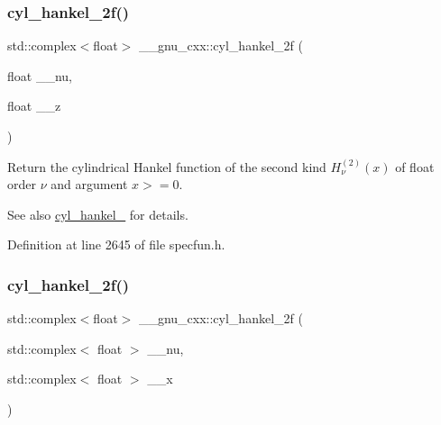 \subsubsection{\texorpdfstring{cyl\+\_\+hankel\+\_\+2f()}{cyl\_hankel\_2f()}\hspace{0.1cm}{\footnotesize\ttfamily [1/2]}}
{\footnotesize\ttfamily std\+::complex$<$float$>$ \+\_\+\+\_\+gnu\+\_\+cxx\+::cyl\+\_\+hankel\+\_\+2f (\begin{DoxyParamCaption}\item[{float}]{\+\_\+\+\_\+nu,  }\item[{float}]{\+\_\+\+\_\+z }\end{DoxyParamCaption})\hspace{0.3cm}{\ttfamily [inline]}}

Return the cylindrical Hankel function of the second kind $ H^{(2)}_\nu(x) $ of {\ttfamily float} order $ \nu $ and argument $ x >= 0 $.

\begin{DoxySeeAlso}{See also}
\hyperlink{group__mathsf__gnu_ga7ebc71dd48ac97255d72f5f5f43dfd8e}{cyl\+\_\+hankel\+\_} for details. 
\end{DoxySeeAlso}


Definition at line 2645 of file specfun.\+h.

\mbox{\label{group__mathsf__gnu_gae21f9d09b937eaf9729982da5a382f20}} 
\subsubsection{\texorpdfstring{cyl\+\_\+hankel\+\_\+2f()}{cyl\_hankel\_2f()}\hspace{0.1cm}{\footnotesize\ttfamily [2/2]}}
{\footnotesize\ttfamily std\+::complex$<$float$>$ \+\_\+\+\_\+gnu\+\_\+cxx\+::cyl\+\_\+hankel\+\_\+2f (\begin{DoxyParamCaption}\item[{std\+::complex$<$ float $>$}]{\+\_\+\+\_\+nu,  }\item[{std\+::complex$<$ float $>$}]{\+\_\+\+\_\+x }\end{DoxyParamCaption})\hspace{0.3cm}{\ttfamily [inline]}}

